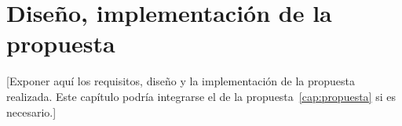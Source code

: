 \chapter{Diseño, implementación de la propuesta}\label{cap:dise-imp}

[Exponer aquí los requisitos, diseño y la implementación de la propuesta realizada. Este capítulo podría integrarse el de la propuesta~\ref{cap:propuesta} si es necesario.]